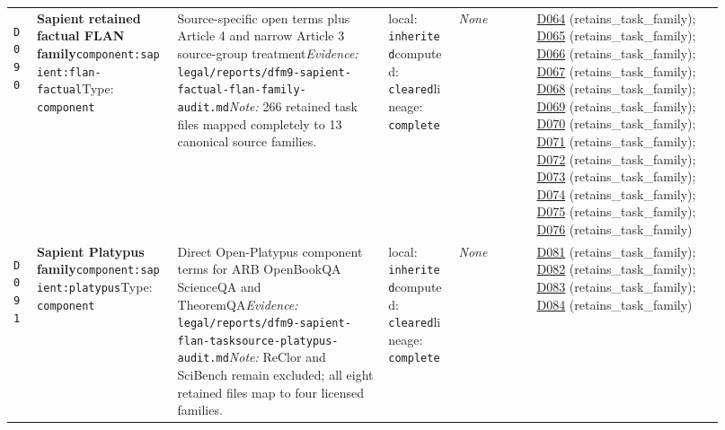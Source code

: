 \documentclass[9pt,a4paper]{article}
\newcommand{\depid}[1]{\hypertarget{dep:#1}{\texttt{#1}}}
\begin{document}
\begin{landscape}
\begin{longtable}{@{}L{0.035\linewidth}L{0.185\linewidth}L{0.27\linewidth}L{0.09\linewidth}L{0.10\linewidth}L{0.24\linewidth}@{}}
\depid{D090} & \textbf{Sapient retained factual FLAN family}\newline \nolinkurl{component:sapient:flan-factual}\newline Type: \texttt{component} & Source-specific open terms plus Article 4 and narrow Article 3 source-group treatment\newline \textit{Evidence:} \nolinkurl{legal/reports/dfm9-sapient-factual-flan-family-audit.md}\newline \textit{Note:} 266 retained task files mapped completely to 13 canonical source families. & local: \texttt{inherited}\newline computed: \texttt{cleared}\newline lineage: \texttt{complete} & \textit{None} & \hyperlink{dep:D064}{D064} (retains\_task\_family); \hyperlink{dep:D065}{D065} (retains\_task\_family); \hyperlink{dep:D066}{D066} (retains\_task\_family); \hyperlink{dep:D067}{D067} (retains\_task\_family); \hyperlink{dep:D068}{D068} (retains\_task\_family); \hyperlink{dep:D069}{D069} (retains\_task\_family); \hyperlink{dep:D070}{D070} (retains\_task\_family); \hyperlink{dep:D071}{D071} (retains\_task\_family); \hyperlink{dep:D072}{D072} (retains\_task\_family); \hyperlink{dep:D073}{D073} (retains\_task\_family); \hyperlink{dep:D074}{D074} (retains\_task\_family); \hyperlink{dep:D075}{D075} (retains\_task\_family); \hyperlink{dep:D076}{D076} (retains\_task\_family) \\
\depid{D091} & \textbf{Sapient Platypus family}\newline \nolinkurl{component:sapient:platypus}\newline Type: \texttt{component} & Direct Open-Platypus component terms for ARB OpenBookQA ScienceQA and TheoremQA\newline \textit{Evidence:} \nolinkurl{legal/reports/dfm9-sapient-flan-tasksource-platypus-audit.md}\newline \textit{Note:} ReClor and SciBench remain excluded; all eight retained files map to four licensed families. & local: \texttt{inherited}\newline computed: \texttt{cleared}\newline lineage: \texttt{complete} & \textit{None} & \hyperlink{dep:D081}{D081} (retains\_task\_family); \hyperlink{dep:D082}{D082} (retains\_task\_family); \hyperlink{dep:D083}{D083} (retains\_task\_family); \hyperlink{dep:D084}{D084} (retains\_task\_family) \\

\end{longtable}
\end{landscape}
\end{document}
